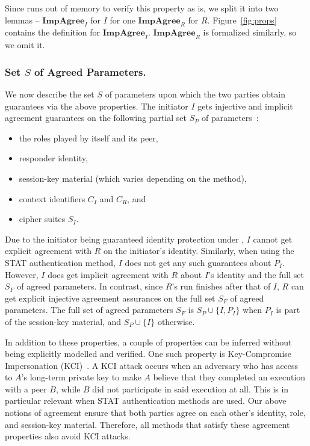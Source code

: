 \documentclass[runningheads]{llncs}
\newcommand{\mConstStyle}[1]{\textsf{#1}}
\newcommand{\mMethodStyle}[1]{\mConstStyle{#1}}
\newcommand{\mProtocolStyle}[1]{\text{#1}}
\newcommand{\mPredImpI}{\ensuremath{\mathbf{ImpAgree}_I}}
\newcommand{\mPredImpR}{\ensuremath{\mathbf{ImpAgree}_R}}
\newcommand{\mTamarin}{\mProtocolStyle{Tamarin}}
\newcommand{\mEdhoc}{\mProtocolStyle{EDHOC}}
\newcommand{\mStat}{\mMethodStyle{STAT}}
\newcommand{\mSuites}{\ensuremath{S_I}}
\newcommand{\mCi}{\ensuremath{C_I}}
\newcommand{\mCr}{\ensuremath{C_R}}
\begin{document}
Since \mTamarin{} runs out of memory to verify this property as is,
we split it into two lemmas -- \mPredImpI{} for $I$ for one \mPredImpR{} for 
$R$.
%
Figure~\ref{fig:props} contains the definition for \mPredImpI{}.
%
\mPredImpR{} is formalized similarly, so we omit it.
%

\subsubsection{Set $S$ of Agreed Parameters.}
\label{sec:agreedParams}
We now describe the set $S$ of parameters upon which the two parties obtain
guarantees via the above properties.
%
The initiator $I$ gets injective and implicit agreement guarantees on the
following partial set $S_P$ of parameters~\cite{Norr21}:
\begin{itemize}
    \item the roles played by itself and its peer,
    \item responder identity,
    \item session-key material (which varies depending on the \mEdhoc{} 
method),
    \item context identifiers \mCi{} and \mCr{}, and
    \item cipher suites \mSuites{}.
\end{itemize}
%

Due to the initiator being guaranteed identity protection under \mEdhoc{}, $I$
cannot get explicit agreement with $R$ on the initiator's identity.
%
Similarly, when using the \mStat{} authentication method, $I$ does not get 
any
such guarantees about $P_{I}$.
%
However, $I$ does get implicit agreement with $R$ about $I$'s identity and the
full set $S_{F}$ of agreed parameters.
%
In contrast, since $R$'s run finishes after that of $I$, $R$ can get explicit
injective agreement assurances on the full set $S_{F}$ of agreed parameters.
%
The full set of agreed parameters $S_F$ is $S_P \cup \{I, P_I\}$ when $P_I$
is part of the session-key material, and $S_P \cup \{I\}$ otherwise.
%

In addition to these properties, a couple of properties can be inferred
without being explicitly modelled and verified.
%
One such property is Key-Compromise Impersonation
(KCI)~\cite{DBLP:conf/ima/Blake-WilsonJM97}.
%
A KCI attack occurs when an adversary who has access to $A$'s long-term 
private
key to make $A$ believe that they completed an execution with a peer $B$,
while $B$ did not participate in said execution at all.
%
This is in particular relevant when \mStat{} authentication methods are used.
%
Our above notions of agreement ensure that both parties agree on each
other's identity, role, and session-key material.
%
Therefore, all \mEdhoc{} methods that satisfy these agreement properties also
avoid KCI attacks.
%
\end{document}
